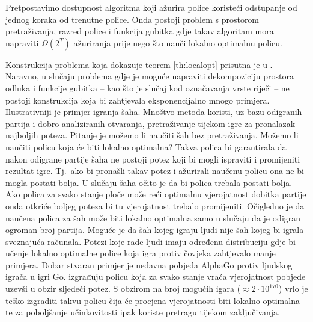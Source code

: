 \begin{theorem} \label{th:localopt}

  Pretpostavimo dostupnost algoritma koji ažurira police koristeći odstupanje od
  jednog koraka od trenutne police. Onda postoji problem s prostorom
  pretraživanja, razred police i funkcija gubitka gdje takav algoritam mora
  napraviti $\Omega(2^T)$ ažuriranja prije nego što nauči lokalno optimalnu
  policu.

\end{theorem}

Konstrukcija problema koja dokazuje teorem \ref{th:localopt} prisutna je u
\cite{daume15lols}. Naravno, u slučaju problema gdje je moguće napraviti
dekompoziciju prostora odluka i funkcije gubitka -- kao što je slučaj kod
označavanja vrste riječi -- ne postoji konstrukcija koja bi zahtjevala
eksponencijalno mnogo primjera. Ilustrativniji je primjer igranja šaha. Mnoštvo
metoda koristi, uz bazu odigranih partija i dobro analiziranih otvaranja,
pretraživanje tijekom igre za pronalazak najboljih poteza. Pitanje je možemo li
naučiti šah bez pretraživanja. Možemo li naučiti policu koja će biti lokalno
optimalna? Takva polica bi garantirala da nakon odigrane partije šaha ne postoji
potez koji bi mogli ispraviti i promijeniti rezultat igre. Tj.~ako bi pronašli
takav potez i ažurirali naučenu policu ona ne bi mogla postati bolja. U slučaju
šaha očito je da bi polica trebala postati bolja. Ako polica za svako stanje
ploče može reći optimalnu vjerojatnost dobitka partije onda otkriće boljeg
poteza bi tu vjerojatnost trebalo promijeniti. Očigledno je da naučena polica za
šah može biti lokalno optimalna samo u slučaju da je odigran ogroman broj
partija. Moguće je da šah kojeg igraju ljudi nije šah kojeg bi igrala sveznajuća
računala. Potezi koje rade ljudi imaju određenu distribuciju gdje bi učenje
lokalno optimalne police koja igra protiv čovjeka zahtjevalo manje primjera.
Dobar stvaran primjer je nedavna pobjeda AlphaGo protiv ljudskog igrača u igri
Go. \citet{silver2016mastering} izgrađuju policu koja za svako stanje vraća
vjerojatnost pobjede uzevši u obzir sljedeći potez. S obzirom na broj mogućih
igara ($\approx 2\cdot10^{170}$) vrlo je teško izgraditi takvu policu čija će
procjena vjerojatnosti biti lokalno optimalna te za poboljšanje učinkovitosti
ipak koriste pretragu tijekom zaključivanja.

